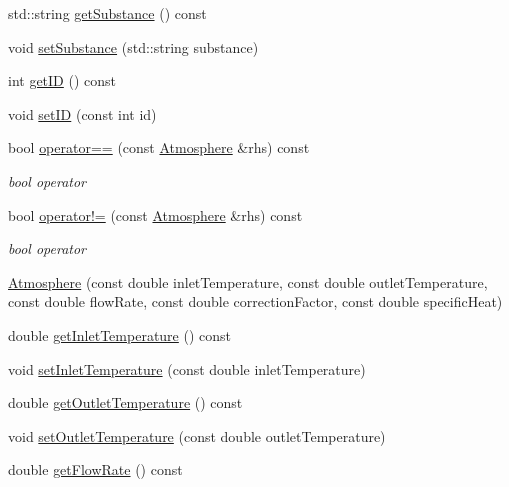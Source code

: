 \begin{DoxyCompactItemize}
\item 
std\+::string \hyperlink{class_atmosphere_a3ac0fb0d4fc92edc690e44b40b7018c2}{get\+Substance} () const
\item 
void \hyperlink{class_atmosphere_aa92f55a1f07304f3e57fdfb8ece65d82}{set\+Substance} (std\+::string substance)
\item 
int \hyperlink{class_atmosphere_a73b921f4d29a4a409488cbdb56c53ff7}{get\+ID} () const
\item 
void \hyperlink{class_atmosphere_a4698bf2580f7c24c8e0617d6455bfcac}{set\+ID} (const int id)
\item 
\mbox{\label{class_atmosphere_a6bddf411a91af4808f52cd69033a5c54}} 
bool \hyperlink{class_atmosphere_a6bddf411a91af4808f52cd69033a5c54}{operator==} (const \hyperlink{class_atmosphere}{Atmosphere} \&rhs) const
\begin{DoxyCompactList}\small\item\em bool operator \end{DoxyCompactList}\item 
\mbox{\label{class_atmosphere_a8f75154e49eb74561dc9053607f502f9}} 
bool \hyperlink{class_atmosphere_a8f75154e49eb74561dc9053607f502f9}{operator!=} (const \hyperlink{class_atmosphere}{Atmosphere} \&rhs) const
\begin{DoxyCompactList}\small\item\em bool operator \end{DoxyCompactList}\item 
\hyperlink{class_atmosphere_adbd727cfc7682d3b3b72a4fb101531f1}{Atmosphere} (const double inlet\+Temperature, const double outlet\+Temperature, const double flow\+Rate, const double correction\+Factor, const double specific\+Heat)
\item 
double \hyperlink{class_atmosphere_acb944a3a99cd40f0132713ce73e6ca4a}{get\+Inlet\+Temperature} () const
\item 
void \hyperlink{class_atmosphere_a592bf7f82ea518fbd9da86d8f10cbc5c}{set\+Inlet\+Temperature} (const double inlet\+Temperature)
\item 
double \hyperlink{class_atmosphere_a717e2dc78ebd13420f8f26707374dd3f}{get\+Outlet\+Temperature} () const
\item 
void \hyperlink{class_atmosphere_a8f6589ab4e17d3c531bb7e0e771f4f80}{set\+Outlet\+Temperature} (const double outlet\+Temperature)
\item 
double \hyperlink{class_atmosphere_ad34708b12c8c9af4fce47669d68ebf4d}{get\+Flow\+Rate} () const

\end{DoxyCompactItemize}
